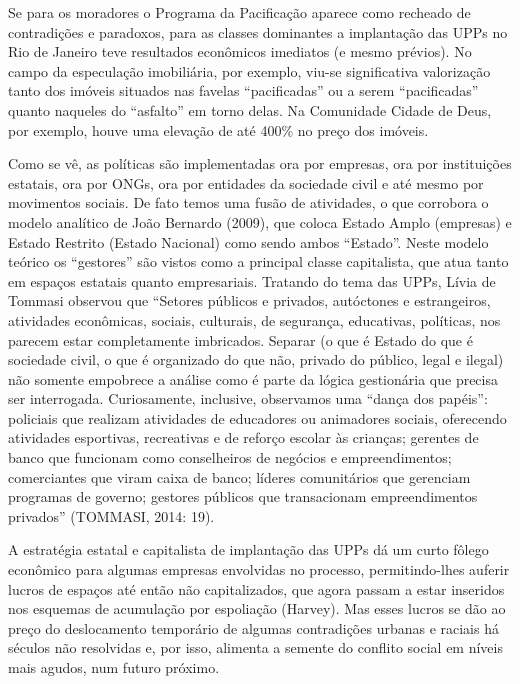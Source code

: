 Se para os moradores o Programa da Pacificação aparece como recheado de
contradições e paradoxos, para as classes dominantes a implantação das
UPPs no Rio de Janeiro teve resultados econômicos imediatos (e mesmo
prévios). No campo da especulação imobiliária, por exemplo, viu-se
significativa valorização tanto dos imóveis situados nas favelas
``pacificadas'' ou a serem ``pacificadas'' quanto naqueles do
``asfalto'' em torno delas. Na Comunidade Cidade de Deus, por exemplo,
houve uma elevação de até 400\% no preço dos imóveis.

Como se vê, as políticas são implementadas ora por empresas, ora por
instituições estatais, ora por ONGs, ora por entidades da sociedade
civil e até mesmo por movimentos sociais. De fato temos uma fusão de
atividades, o que corrobora o modelo analítico de João Bernardo (2009),
que coloca Estado Amplo (empresas) e Estado Restrito (Estado Nacional)
como sendo ambos ``Estado''. Neste modelo teórico os ``gestores'' são
vistos como a principal classe capitalista, que atua tanto em espaços
estatais quanto empresariais. Tratando do tema das UPPs, Lívia de
Tommasi observou que ``Setores públicos e privados, autóctones e
estrangeiros, atividades econômicas, sociais, culturais, de segurança,
educativas, políticas, nos parecem estar completamente imbricados.
Separar (o que é Estado do que é sociedade civil, o que é organizado do
que não, privado do público, legal e ilegal) não somente empobrece a
análise como é parte da lógica gestionária que precisa ser interrogada.
Curiosamente, inclusive, observamos uma ``dança dos papéis'': policiais
que realizam atividades de educadores ou animadores sociais, oferecendo
atividades esportivas, recreativas e de reforço escolar às crianças;
gerentes de banco que funcionam como conselheiros de negócios e
empreendimentos; comerciantes que viram caixa de banco; líderes
comunitários que gerenciam programas de governo; gestores públicos que
transacionam empreendimentos privados'' (TOMMASI, 2014: 19).

A estratégia estatal e capitalista de implantação das UPPs dá um curto
fôlego econômico para algumas empresas envolvidas no processo,
permitindo-lhes auferir lucros de espaços até então não capitalizados,
que agora passam a estar inseridos nos esquemas de acumulação por
espoliação (Harvey). Mas esses lucros se dão ao preço do deslocamento
temporário de algumas contradições urbanas e raciais há séculos não
resolvidas e, por isso, alimenta a semente do conflito social em níveis
mais agudos, num futuro próximo.

